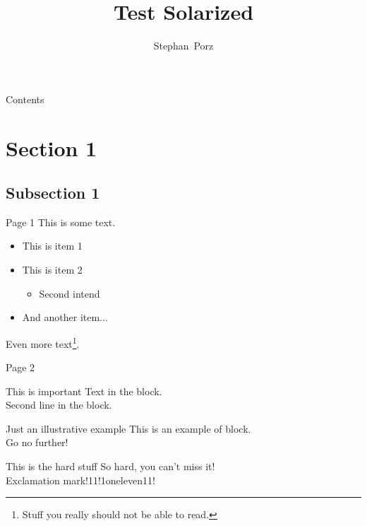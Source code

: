 \documentclass[xcolor=dvipsnames]{beamer}
\title{Test Solarized}
\subtitle{}
\author{Stephan~Porz}
\institute[Universität Bonn]{}
\date[]{}
\begin{document}

\begin{frame}[plain]
    \titlepage
\end{frame}



\begin{frame}{Contents}
    \tableofcontents
\end{frame}



\section{Section 1}
\subsection{Subsection 1}
\begin{frame}{Page 1}
    This is some text.
    \begin{itemize}
        \item This is item 1
        \item This is item 2
        \begin{itemize}
            \item Second intend
        \end{itemize}			
        \item And another item...
    \end{itemize}
    Even more text\footnote{Stuff you really should not be able to read.}.
\end{frame}

\begin{frame}{Page 2}
    \begin{block}{This is important}
        Text in the block.\\
	Second line in the block.
    \end{block}
    \begin{exampleblock}{Just an illustrative example}
        This is an example of block. \\
	Go no further!
    \end{exampleblock}
    \begin{alertblock}{This is the hard stuff}
        So hard, you can't miss it! \\
	Exclamation mark!11!1oneleven11!
    \end{alertblock}
\end{frame}
\end{document}
